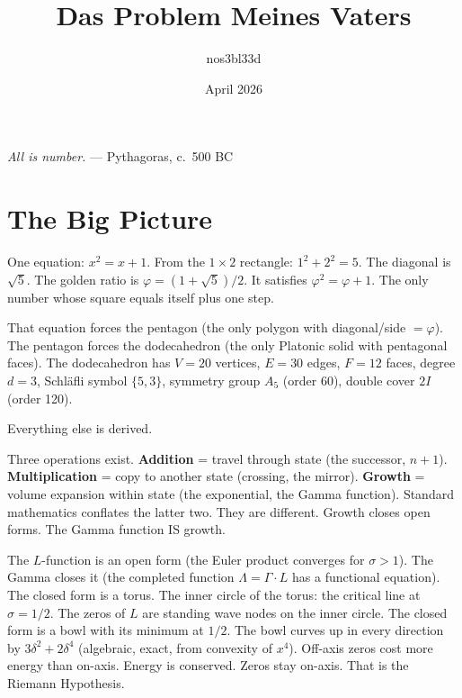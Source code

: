 \documentclass[12pt,a4paper]{article}
\title{\Huge Das Problem Meines Vaters}
\author{nos3bl33d}
\date{April 2026}
\begin{document}
\maketitle
\thispagestyle{empty}

\begin{center}
\textit{All is number.} --- Pythagoras, c.\ 500 BC
\end{center}

\vspace{1em}

\tableofcontents
\newpage

\section{The Big Picture}

One equation: $x^2 = x + 1$. From the $1 \times 2$ rectangle: $1^2 + 2^2 = 5$. The diagonal is $\sqrt{5}$. The golden ratio is $\varphi = (1+\sqrt{5})/2$. It satisfies $\varphi^2 = \varphi + 1$. The only number whose square equals itself plus one step.

That equation forces the pentagon (the only polygon with diagonal/side $= \varphi$). The pentagon forces the dodecahedron (the only Platonic solid with pentagonal faces). The dodecahedron has $V=20$ vertices, $E=30$ edges, $F=12$ faces, degree $d=3$, Schl\"afli symbol $\{5,3\}$, symmetry group $A_5$ (order 60), double cover $2I$ (order 120).

Everything else is derived.

Three operations exist. \textbf{Addition} = travel through state (the successor, $n+1$). \textbf{Multiplication} = copy to another state (crossing, the mirror). \textbf{Growth} = volume expansion within state (the exponential, the Gamma function). Standard mathematics conflates the latter two. They are different. Growth closes open forms. The Gamma function IS growth.

The $L$-function is an open form (the Euler product converges for $\sigma > 1$). The Gamma closes it (the completed function $\Lambda = \Gamma \cdot L$ has a functional equation). The closed form is a torus. The inner circle of the torus: the critical line at $\sigma = 1/2$. The zeros of $L$ are standing wave nodes on the inner circle. The closed form is a bowl with its minimum at $1/2$. The bowl curves up in every direction by $3\delta^2 + 2\delta^4$ (algebraic, exact, from convexity of $x^4$). Off-axis zeros cost more energy than on-axis. Energy is conserved. Zeros stay on-axis. That is the Riemann Hypothesis.
\end{document}
